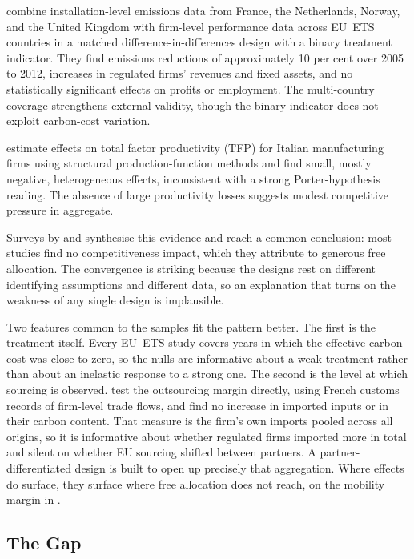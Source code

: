 \citet{dechezlepretre2023} combine installation-level emissions data from France, the Netherlands, Norway, and the United Kingdom with firm-level performance data across EU~ETS countries in a matched difference-in-differences design with a binary treatment indicator. They find emissions reductions of approximately 10 per cent over 2005 to 2012, increases in regulated firms' revenues and fixed assets, and no statistically significant effects on profits or employment. The multi-country coverage strengthens external validity, though the binary indicator does not exploit carbon-cost variation.

\citet{darcangelo2022} estimate effects on total factor productivity (TFP) for Italian manufacturing firms using structural production-function methods and find small, mostly negative, heterogeneous effects, inconsistent with a strong Porter-hypothesis reading. The absence of large productivity losses suggests modest competitive pressure in aggregate.

Surveys by \citet{joltreau2019} and \citet{verde2020} synthesise this evidence and reach a common conclusion: most studies find no competitiveness impact, which they attribute to generous free allocation. The convergence is striking because the designs rest on different identifying assumptions and different data, so an explanation that turns on the weakness of any single design is implausible.

Two features common to the samples fit the pattern better. The first is the treatment itself. Every EU~ETS study covers years in which the effective carbon cost was close to zero, so the nulls are informative about a weak treatment rather than about an inelastic response to a strong one. The second is the level at which sourcing is observed. \citet{colmer2025} test the outsourcing margin directly, using French customs records of firm-level trade flows, and find no increase in imported inputs or in their carbon content. That measure is the firm's own imports pooled across all origins, so it is informative about whether regulated firms imported more in total and silent on whether EU sourcing shifted between partners. A partner-differentiated design is built to open up precisely that aggregation. Where effects do surface, they surface where free allocation does not reach, on the mobility margin in \citet{koch2019}.

\subsection{The Gap}

